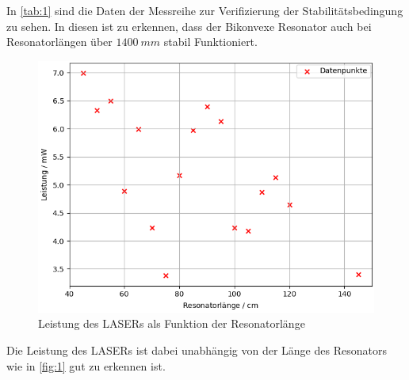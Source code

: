 \noindent
In \autoref{tab:1} sind die Daten der Messreihe zur Verifizierung der Stabilitätsbedingung zu sehen. In diesen ist zu erkennen, dass der Bikonvexe Resonator auch bei Resonatorlängen über $\SI{1400}{mm}$ stabil Funktioniert. 
\begin{figure}[H]
  \centering
  \includegraphics[width=0.55\linewidth]{plots/stab_bed_1.png}
  \caption{Leistung des LASERs als Funktion der Resonatorlänge}
  \label{fig:1}
\end{figure}
\noindent
Die Leistung des LASERs ist dabei unabhängig von der Länge des Resonators wie in \autoref{fig:1} gut zu erkennen ist.
\newpage
